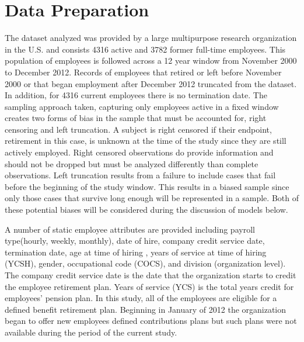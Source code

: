 \documentclass[12pt,letterpaper]{article}
\begin{document}
\section{Data Preparation}\label{data.desc}
The dataset analyzed was provided by a large multipurpose research organization in the U.S. and consists 4316 active and 3782 former full-time employees.  This population of employees is followed across a 12 year window from November 2000 to December 2012.  Records of employees that retired or left before November 2000 or that began employment after December 2012 truncated from the dataset. In addition, for 4316 current employees there is no termination date. The sampling approach taken, capturing only employees active in a fixed window creates two forms of bias in the sample that must be accounted for, right censoring and left truncation. A subject is right censored if their endpoint, retirement in this case, is unknown at the time of the study since they are still actively employed.  Right censored observations do provide information and should not be dropped but must be analyzed differently than complete observations.   Left truncation results from a failure to include cases that fail before the beginning of the study window.  This results in a biased sample since only those cases that survive long enough will be represented in a sample.  Both of these potential biases will be considered during the discussion of models below.


A number of static employee attributes are provided including payroll type(hourly, weekly, monthly), date of hire, company credit service date, termination date, age at time of hiring , years of service at time of hiring (YCSH), gender, occupational code (COCS), and division (organization level). The company credit service date is the date that the organization starts to credit the employee retirement plan. Years of service (YCS) is the total years credit for employees' pension plan. In this study, all of the employees are eligible for a defined benefit retirement plan. Beginning in January of 2012 the organization began to offer new employees defined contributions plans but such plans were not available during the period of the current study.
\end{document}
